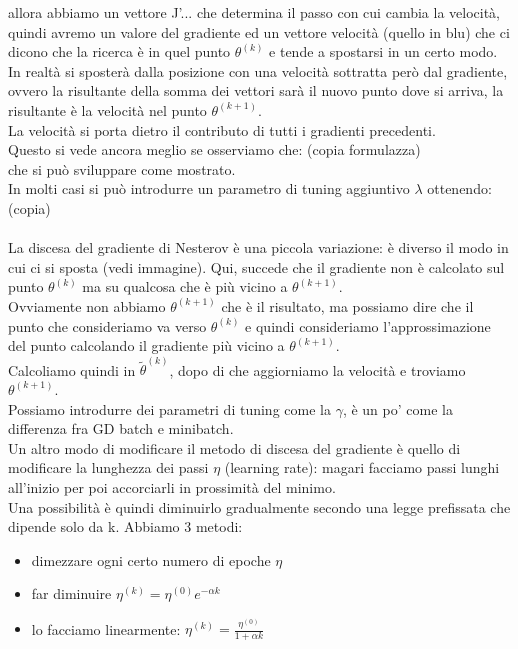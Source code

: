 \documentclass[12pt, oneside]{extbook}
\begin{document}
allora abbiamo un vettore J'... che determina il passo con cui cambia la velocità, quindi avremo un valore del gradiente ed un vettore velocità (quello in blu) che ci dicono che la ricerca è in quel punto $\theta^{(k)}$ e tende a spostarsi in un certo modo.\\In realtà si sposterà dalla posizione con una velocità sottratta però dal gradiente, ovvero la risultante della somma dei vettori sarà il nuovo punto dove si arriva, la risultante è la velocità nel punto $\theta^{(k+1)}$.\\La velocità si porta dietro il contributo di tutti i gradienti precedenti.\\Questo si vede ancora meglio se osserviamo che: (copia formulazza)\\ che si può sviluppare come mostrato.\\In molti casi si può introdurre un parametro di tuning aggiuntivo $\lambda$ ottenendo: (copia)\\\\La discesa del gradiente di Nesterov è una piccola variazione: è diverso il modo in cui ci si sposta (vedi immagine). Qui, succede che il gradiente non è calcolato sul punto $\theta^{(k)}$ ma su qualcosa che è più vicino a $\theta^{(k+1)}$.\\Ovviamente non abbiamo $\theta^{(k+1)}$ che è il risultato, ma possiamo dire che il punto che consideriamo va verso $\theta^{(k)}$ e quindi consideriamo l'approssimazione del punto calcolando il gradiente più vicino a $\theta^{(k+1)}$.\\Calcoliamo quindi in $\tilde{\theta}^{(k)}$, dopo di che aggiorniamo la velocità e troviamo $\theta^{(k+1)}$.\\ Possiamo introdurre dei parametri di tuning come la $\gamma$, è un po' come la differenza fra GD batch e minibatch.\\Un altro modo di modificare il metodo di discesa del gradiente è quello di modificare la lunghezza dei passi $\eta$ (learning rate): magari facciamo passi lunghi all'inizio per poi accorciarli in prossimità del minimo.\\Una possibilità è quindi diminuirlo gradualmente secondo una legge prefissata che dipende solo da k. Abbiamo 3 metodi:
\begin{itemize}
	\item dimezzare ogni certo numero di epoche $\eta$
	\item far diminuire $\eta^{(k)} = \eta^{(0)}e^{-\alpha k}$
	\item lo facciamo linearmente: $\eta^{(k)} = \frac{\eta^{(0)}}{1+\alpha k}$
\end{itemize}
\end{document}
